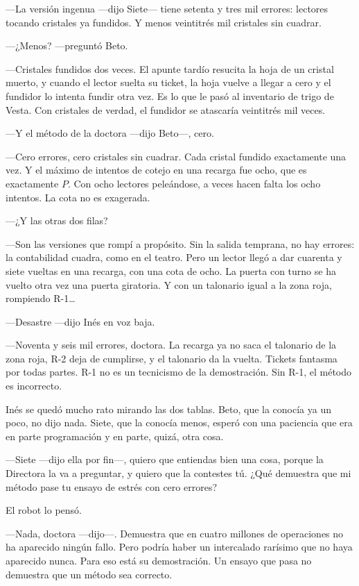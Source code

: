 ---La versión ingenua ---dijo Siete--- tiene setenta y tres mil errores: lectores tocando cristales ya fundidos. Y menos veintitrés mil cristales sin cuadrar.

---¿Menos? ---preguntó Beto.

---Cristales fundidos dos veces. El apunte tardío resucita la hoja de un cristal muerto, y cuando el lector suelta su ticket, la hoja vuelve a llegar a cero y el fundidor lo intenta fundir otra vez. Es lo que le pasó al inventario de trigo de Vesta. Con cristales de verdad, el fundidor se atascaría veintitrés mil veces.

---Y el método de la doctora ---dijo Beto---\nobreak, cero.

---Cero errores, cero cristales sin cuadrar. Cada cristal fundido exactamente una vez. Y el máximo de intentos de cotejo en una recarga fue ocho, que es exactamente $P$. Con ocho lectores peleándose, a veces hacen falta los ocho intentos. La cota no es exagerada.

---¿Y las otras dos filas?

---Son las versiones que rompí a propósito. Sin la salida temprana, no hay errores: la contabilidad cuadra, como en el teatro. Pero un lector llegó a dar cuarenta y siete vueltas en una recarga, con una cota de ocho. La puerta con turno se ha vuelto otra vez una puerta giratoria. Y con un talonario igual a la zona roja, rompiendo R-1\ldots

---Desastre ---dijo Inés en voz baja.

---Noventa y seis mil errores, doctora. La recarga ya no saca el talonario de la zona roja, R-2 deja de cumplirse, y el talonario da la vuelta. Tickets fantasma por todas partes. R-1 no es un tecnicismo de la demostración. Sin R-1, el método es incorrecto.

\escena
Inés se quedó mucho rato mirando las dos tablas. Beto, que la conocía ya un poco, no dijo nada. Siete, que la conocía menos, esperó con una paciencia que era en parte programación y en parte, quizá, otra cosa.

---Siete ---dijo ella por fin---\nobreak, quiero que entiendas bien una cosa, porque la Directora la va a preguntar, y quiero que la contestes tú. ¿Qué demuestra que mi método pase tu ensayo de estrés con cero errores?

El robot lo pensó.

---Nada, doctora ---dijo---\nobreak. Demuestra que en cuatro millones de operaciones no ha aparecido ningún fallo. Pero podría haber un intercalado rarísimo que no haya aparecido nunca. Para eso está su demostración. Un ensayo que pasa no demuestra que un método sea correcto.

